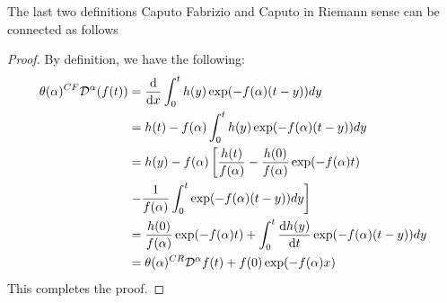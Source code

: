 \documentclass[twoside]{book}
\begin{document}
{The last two definitions Caputo Fabrizio and Caputo in Riemann sense can be connected as follows
\begin{proof}
    By definition, we have the following:
    \begin{align*}
        \theta(\alpha) ^{CF}\mathcal{D}^{\alpha} (f(t)) & = \dv{}{x} \int_0^t h(y) \exp(-f(\alpha)(t-y))dy                                                  \\
                                                        & = h(t) - f(\alpha) \int_0^t h(y) \exp(-f(\alpha)(t-y))dy                                          \\
                                                        & = h(y) - f(\alpha)\left[\frac{h(t)}{f(\alpha)} - \frac{h(0)}{f(\alpha)}\exp(-f(\alpha)t)  \right. \\
                                                        & \left. - \frac{1}{f(\alpha)}\int_0^t \exp(-f(\alpha)(t-y))dy \right]                              \\
                                                        & = \frac{h(0)}{f(\alpha)}\exp(-f(\alpha)t)+\int_0^t \dv{h(y)}{t}\exp(-f(\alpha)(t-y))dy            \\
                                                        & = \theta(\alpha) ^{CR}\mathcal{D}^{\alpha}f(t) + f(0)\exp(-f(\alpha)x)
    \end{align*}
    This completes the proof.
\end{proof}
}
\end{document}
